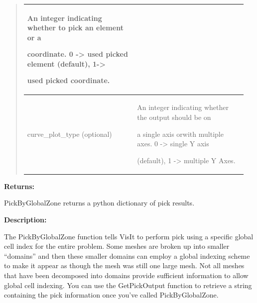 \documentclass[letterpaper,10pt,english]{sphinxmanual}
\begin{document}
\begin{quote}
\begin{tabular}{|p{0.475\linewidth}|p{0.475\linewidth}|}
\begin{DUlineblock}{0em}
\item[] An integer indicating whether to pick an element or a
\item[] coordinate. 0 -\textgreater{} used picked element (default), 1-\textgreater{}
\item[] used picked coordinate.
\end{DUlineblock}
\\
\hline
curve\_plot\_type (optional)
 & 
\begin{DUlineblock}{0em}
\item[] An integer indicating whether the output should be on
\item[] a single axis orwith multiple axes. 0 -\textgreater{} single Y axis
\item[] (default), 1 -\textgreater{} multiple Y Axes.
\end{DUlineblock}
\\
\hline\end{tabular}

\end{quote}

\begin{DUlineblock}{0em}
\item[] 
\item[] \textbf{Returns:}
\item[] PickByGlobalZone returns a python dictionary of pick results.
\item[] 
\item[] \textbf{Description:}
\item[] The PickByGlobalZone function tells VisIt to perform pick using a specific
global cell index for the entire problem. Some meshes are broken up into
smaller ``domains'' and then these smaller domains can employ a global
indexing scheme to make it appear as though the mesh was still one large
mesh. Not all meshes that have been decomposed into domains provide
sufficient information to allow global cell indexing. You can use the
GetPickOutput function to retrieve a string containing the pick information
once you've called PickByGlobalZone.
\end{DUlineblock}

\begin{DUlineblock}{0em}
\item[] 
\end{DUlineblock}
\end{document}
